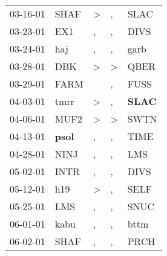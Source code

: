 \begin{supertabular}{p{0.07\textwidth}p{0.06\textwidth}p{0.02\textwidth}p{0.02\textwidth}p{0.06\textwidth}}
          03-16-01\textsuperscript{} &           SHAF\textsuperscript{} &     \textgreater &                , &           SLAC\textsuperscript{} \\
          03-23-01\textsuperscript{} &            EX1\textsuperscript{} &                , &                , &           DIVS\textsuperscript{} \\
          03-24-01\textsuperscript{} &            haj\textsuperscript{} &                , &                , &           garb\textsuperscript{} \\
          03-28-01\textsuperscript{} &            DBK\textsuperscript{} &     \textgreater &     \textgreater &           QBER\textsuperscript{} \\
          03-29-01\textsuperscript{} &           FARM\textsuperscript{} &                  &                , &           FUSS\textsuperscript{} \\
          04-03-01\textsuperscript{} &           tmrr\textsuperscript{} &     \textgreater &                , &  \textbf{SLAC\textsuperscript{}} \\
          04-06-01\textsuperscript{} &           MUF2\textsuperscript{} &     \textgreater &     \textgreater &           SWTN\textsuperscript{} \\
          04-13-01\textsuperscript{} &  \textbf{psol\textsuperscript{}} &                , &                , &           TIME\textsuperscript{} \\
          04-28-01\textsuperscript{} &           NINJ\textsuperscript{} &                , &                , &            LMS\textsuperscript{} \\
          05-02-01\textsuperscript{} &           INTR\textsuperscript{} &                , &                , &           DIVS\textsuperscript{} \\
          05-12-01\textsuperscript{} &            h19\textsuperscript{} &     \textgreater &                , &           SELF\textsuperscript{} \\
          05-25-01\textsuperscript{} &            LMS\textsuperscript{} &                , &                , &           SNUC\textsuperscript{} \\
          06-01-01\textsuperscript{} &           kabu\textsuperscript{} &                , &                , &           bttm\textsuperscript{} \\
          06-02-01\textsuperscript{} &           SHAF\textsuperscript{} &                , &                , &           PRCH\textsuperscript{} \\

\end{supertabular}
